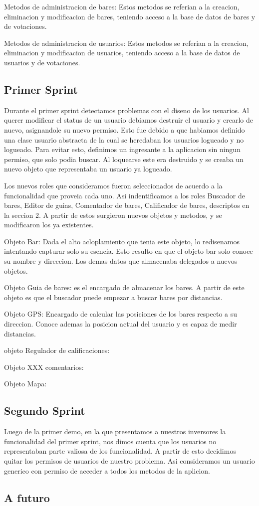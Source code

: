 Metodos de administracion de bares: Estos metodos se referian a la creacion, eliminacion y modificacion de bares, teniendo acceso a la base de datos de bares y de votaciones.


Metodos de administracion de usuarios: Estos metodos se referian a la creacion, eliminacion y modificacion de usuarios, teniendo acceso a la base de datos de usuarios y de votaciones.


\subsection{Primer Sprint}

Durante el primer sprint detectamos problemas con el diseno de los usuarios. Al querer modificar el status de un usuario debiamos destruir el usuario y crearlo de nuevo, asignandole su nuevo
permiso. Esto fue debido a que habiamos definido una clase usuario abstracta de la cual se heredaban los usuarios logueado y no logueado. Para evitar esto, definimos un ingresante a la aplicacion sin ningun permiso, que solo podia buscar. Al loquearse este era destruido y se creaba
un nuevo objeto que representaba un usuario ya logueado.

Los nuevos roles que consideramos fueron seleccionados de acuerdo a la funcionalidad que proveia cada uno. Asi indentificamos a los roles Buscador de bares, Editor de guias, Comentador
de bares, Calificador de bares, descriptos en la seccion 2. A partir de estos surgieron nuevos objetos y metodos, y se modificaron los ya existentes.

Objeto Bar: Dada el alto acloplamiento que tenia este objeto, lo redisenamos intentando capturar solo su esencia. Esto resulto en que el objeto bar solo conoce su nombre y direccion. 
Los demas datos que almacenaba delegados a nuevos objetos.

Objeto Guia de bares: es el encargado de almacenar los bares. A partir de este objeto es que el buscador puede empezar a buscar bares por distancias.

Objeto GPS: Encargado de calcular las posiciones de los bares respecto a su direccion. Conoce ademas la posicion actual del usuario y es capaz de medir distancias.

objeto Regulador de calificaciones:

Objeto XXX comentarios:

Objeto Mapa:

\subsection{Segundo Sprint}

Luego de la primer demo, en la que presentamos a nuestros inversores la funcionalidad del primer sprint, nos dimos cuenta que los usuarios 
no representaban parte valiosa de los funcionalidad. A partir de esto decidimos quitar los permisos de usuarios de nuestro problema. Asi consideramos un usuario generico con permiso de 
acceder a todos los metodos de la aplicion.

\subsection{A futuro}


